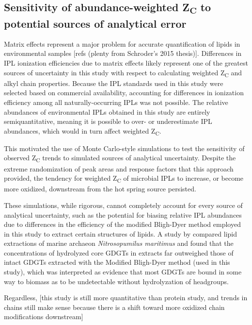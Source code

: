 \subsection{Sensitivity of abundance-weighted Z\textsubscript{C} to potential sources of analytical error} Matrix effects represent a major problem for accurate quantification of lipids in environmental samples [refs (plenty from Schroder’s 2015 thesis)]. Differences in IPL ionization efficiencies due to matrix effects likely represent one of the greatest sources of uncertainty in this study with respect to calculating weighted Z\textsubscript{C} and alkyl chain properties. Because the IPL standards used in this study were selected based on commercial availability, accounting for differences in ionization efficiency among all naturally-occurring IPLs was not possible. The relative abundances of environmental IPLs obtained in this study are entirely semiquantitative, meaning it is possible to over- or underestimate IPL abundances, which would in turn affect weighted Z\textsubscript{C}.

This motivated the use of Monte Carlo-style simulations to test the sensitivity of observed Z\textsubscript{C} trends to simulated sources of analytical uncertainty. Despite the extreme randomization of peak areas and response factors that this approach provided, the tendency for weighted Z\textsubscript{C} of microbial IPLs to increase, or become more oxidized, downstream from the hot spring source persisted.

These simulations, while rigorous, cannot completely account for every source of analytical uncertainty, such as the potential for biasing relative IPL abundances due to differences in the efficiency of the modified Bligh-Dyer method employed in this study to extract certain structures of lipids. A study by \cite{huguet2010changes} compared lipid extractions of marine archaeon \textit{Nitrosopumilus maritimus} and found that the concentrations of hydrolyzed core GDGTs in extracts far outweighed those of intact GDGTs extracted with the Modified Bligh-Dyer method (used in this study), which was interpreted as evidence that most GDGTs are bound in some way to biomass as to be undetectable without hydrolyzation of headgroups.


Regardless, [this study is still more quantitative than protein study, and trends in chains still make sense because there is a shift toward more oxidized chain modifications downstream]

